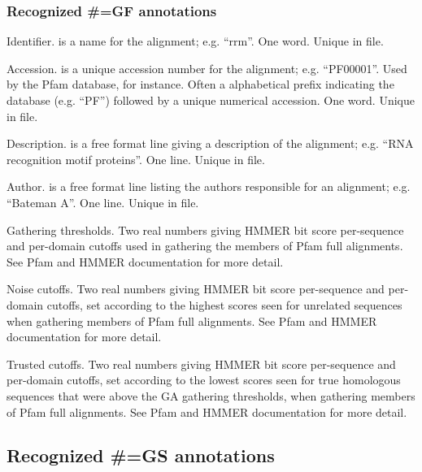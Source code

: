 \subsubsection{Recognized \#=GF annotations}
\begin{sreitems}{}
\item [\emcode{ID  <s>}] 
	Identifier.  is a name for the alignment;
	e.g. ``rrm''. One word. Unique in file.

\item [\emcode{AC  <s>}]
	Accession.  is a unique accession number for the
	alignment; e.g. 
	``PF00001''. Used by the Pfam database, for instance. 
	Often a alphabetical prefix indicating the database
	(e.g. ``PF'') followed by a unique numerical accession.
	One word. Unique in file. 
	
\item [\emcode{DE  <s>}]
	Description.  is a free format line giving
	a description of the alignment; e.g.
	``RNA recognition motif proteins''. One line. Unique in file.

\item [\emcode{AU  <s>}]
	Author.  is a free format line listing the 
	authors responsible for an alignment; e.g. 
	``Bateman A''. One line. Unique in file.

\item [\emcode{GA  <f> <f>}]
	Gathering thresholds. Two real numbers giving HMMER bit score
	per-sequence and per-domain cutoffs used in gathering the
	members of Pfam full alignments. See Pfam and HMMER
	documentation for more detail.
	
\item [\emcode{NC  <f> <f>}]
	Noise cutoffs. Two real numbers giving HMMER bit score
	per-sequence and per-domain cutoffs, set according to the
	highest scores seen for unrelated sequences when gathering
	members of Pfam full alignments. See Pfam and HMMER
	documentation for more detail.

\item [\emcode{TC  <f> <f>}]
	Trusted cutoffs. Two real numbers giving HMMER bit score
	per-sequence and per-domain cutoffs, set according to the
	lowest scores seen for true homologous sequences that
	were above the GA gathering thresholds, when gathering
	members of Pfam full alignments. See Pfam and HMMER
	documentation for more detail.
\end{sreitems}

\subsection{Recognized \#=GS annotations}


